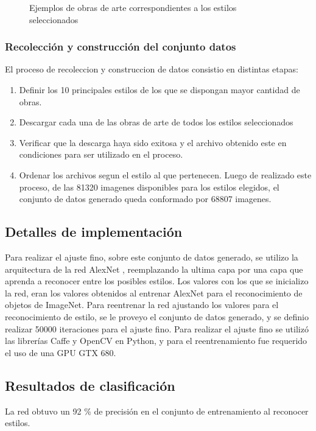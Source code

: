 \documentclass[a4paper,11pt,spanish]{book}
\begin{document}
\begin{figure}
\begin{tabularx}{\textwidth}{@{}cXX@{}}
	  \end{tabularx}

	  \caption{Ejemplos de obras de arte correspondientes a los estilos seleccionados}\label{mosaico_estilos}
	\end{figure}

      \subsubsection{Recolección y construcción del conjunto datos}
	El proceso de recoleccion y construccion de datos consistio en distintas etapas:
	\begin{enumerate}
	 \item Definir los 10 principales estilos de los que se dispongan mayor cantidad de obras.
	 \item Descargar cada una de las obras de arte de todos los estilos seleccionados
	 \item Verificar que la descarga haya sido exitosa y el archivo obtenido este en condiciones para ser utilizado en el proceso.
	 \item Ordenar los archivos segun el estilo al que pertenecen.
	 Luego de realizado este proceso, de las 81320 imagenes disponibles para los estilos elegidos, el conjunto de datos generado queda conformado por 68807 imagenes.
	\end{enumerate}

    \subsection{Detalles de implementación}
      Para realizar el ajuste fino, sobre este conjunto de datos generado, se utilizo la arquitectura de la red AlexNet \cite{AlexNet}, reemplazando la ultima capa por una capa que
      aprenda a reconocer entre los posibles estilos. Los valores con los que se inicializo la red, eran los valores obtenidos al entrenar AlexNet para el reconocimiento de objetos de ImageNet.
      Para reentrenar la red ajustando los valores para el reconocimiento de estilo, se le proveyo el conjunto de datos generado, y se definio realizar 50000 iteraciones para el ajuste fino.
      Para realizar el ajuste fino se utilizó las librerías Caffe y OpenCV en Python, y para el reentrenamiento fue requerido el uso de una GPU GTX 680.

  \subsection{Resultados de clasificación}
   La red obtuvo un 92 \% de precisión en el conjunto de entrenamiento al reconocer estilos.
\end{document}

